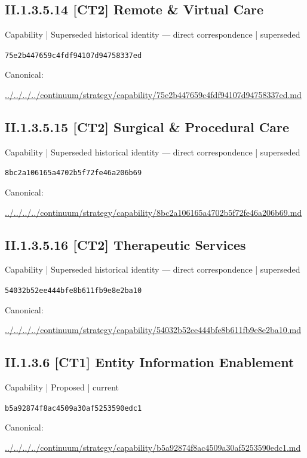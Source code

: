 \documentclass[10pt,a4paper]{article}
\begin{document}
\subsection*{II.1.3.5.14 [CT2] Remote \& Virtual Care}
{\small Capability | Superseded historical identity — direct correspondence | superseded}\par
\texttt{75e2b447659c4fdf94107d94758337ed}\par
Canonical: \par
{\footnotesize\url{../../../../continuum/strategy/capability/75e2b447659c4fdf94107d94758337ed.md}}\par
\subsection*{II.1.3.5.15 [CT2] Surgical \& Procedural Care}
{\small Capability | Superseded historical identity — direct correspondence | superseded}\par
\texttt{8bc2a106165a4702b5f72fe46a206b69}\par
Canonical: \par
{\footnotesize\url{../../../../continuum/strategy/capability/8bc2a106165a4702b5f72fe46a206b69.md}}\par
\subsection*{II.1.3.5.16 [CT2] Therapeutic Services}
{\small Capability | Superseded historical identity — direct correspondence | superseded}\par
\texttt{54032b52ee444bfe8b611fb9e8e2ba10}\par
Canonical: \par
{\footnotesize\url{../../../../continuum/strategy/capability/54032b52ee444bfe8b611fb9e8e2ba10.md}}\par
\subsection*{II.1.3.6 [CT1] Entity Information Enablement}
{\small Capability | Proposed | current}\par
\texttt{b5a92874f8ac4509a30af5253590edc1}\par
Canonical: \par
{\footnotesize\url{../../../../continuum/strategy/capability/b5a92874f8ac4509a30af5253590edc1.md}}\par
\end{document}
